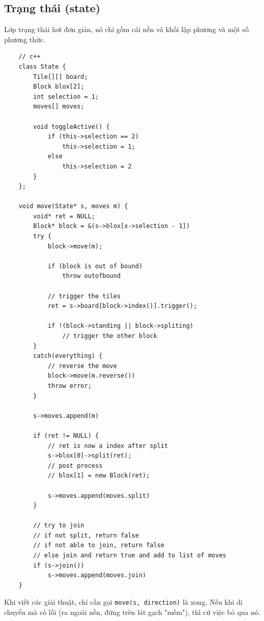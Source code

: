 \documentclass[a4paper, 11pt]{article}
\begin{document}
\subsection{Trạng thái (state)}
Lớp trạng thái hơi đơn giản, nó chỉ gồm cái nền và khối lập phương và một số phương thức.
\begin{lstlisting}
    // c++
    class State {
        Tile[][] board;
        Block blox[2];
        int selection = 1;
        moves[] moves;
    
        void toggleActive() {
            if (this->selection == 2)
                this->selection = 1;
            else
                this->selection = 2
        }
    };
    
    void move(State* s, moves m) {
        void* ret = NULL;
        Block* block = &(s->blox[x->selection - 1])
        try {
            block->move(m);
    
            if (block is out of bound)
                throw outofbound
    
            // trigger the tiles
            ret = s->board[block->index()].trigger();
    
            if !(block->standing || block->spliting)
                // trigger the other block
        }
        catch(everything) {
            // reverse the move
            block->move(m.reverse())
            throw error;
        }
    
        s->moves.append(m)
    
        if (ret != NULL) {
            // ret is now a index after split
            s->blox[0]->split(ret);
            // post process
            // blox[1] = new Block(ret);
    
            s->moves.append(moves.split)
        }
    
        // try to join
        // if not split, return false
        // if not able to join, return false
        // else join and return true and add to list of moves
        if (s->join())
            s->moves.append(moves.join)
    }
\end{lstlisting}
Khi viết các giải thuật, chỉ cần gọi \texttt{move(s, direction)} là xong. Nếu khi di chuyển mà có lỗi
(ra ngoài nền, đứng trên lát gạch "mềm"), thì cứ việc bỏ qua nó.
\end{document}
